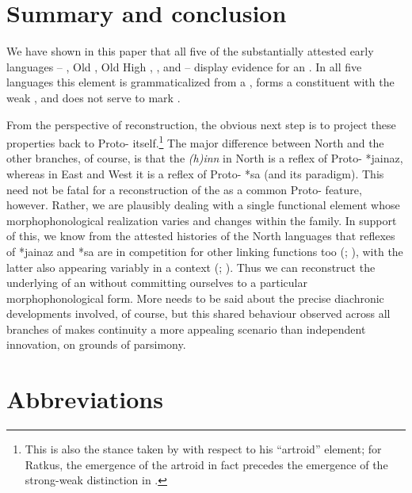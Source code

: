 \documentclass[output=paper,colorlinks,citecolor=brown]{langscibook}
\begin{document}
\section{Summary and conclusion}\label{sec:9:conclusion}

We have shown in this paper that all five of the substantially attested early  languages -- , Old , Old High , , and  -- display evidence for an . In all five languages this element is grammaticalized from a , forms a constituent with the weak , and does not serve to mark .

From the perspective of  reconstruction, the obvious next step is to project these properties back to Proto- itself.\footnote{This is also the stance taken by \citet[249--250]{ratkus2011} with respect to his ``artroid'' element; for Ratkus, the emergence of the artroid in fact precedes the emergence of the strong-weak  distinction in .} The major difference between North  and the other branches, of course, is that the  \emph{(h)inn} in North  is a reflex of Proto- *jainaz, whereas in East and West  it is a reflex of Proto- *sa (and its paradigm). This need not be fatal for a reconstruction of the  as a common Proto- feature, however. Rather, we are plausibly dealing with a single functional element whose morphophonological realization varies and changes within the  family. In support of this, we know from the attested histories of the North  languages that reflexes of *jainaz and *sa are in competition for other linking functions too (\citealt{Ulla2009,Ulla2015,Ulla2020}; \citealt{Pfaff2019}), with the latter also appearing variably in a  context (\citealt{wagenerRC}; \citealt{sapp2019RC}). Thus we can reconstruct the underlying  of an  without committing ourselves to a particular morphophonological form. More needs to be said about the precise diachronic developments involved, of course, but this shared behaviour observed across all branches of  makes continuity a more appealing scenario than independent innovation, on grounds of parsimony.


\section*{Abbreviations}
\end{document}
